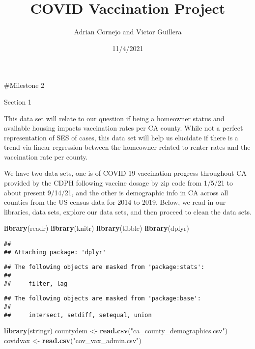 \documentclass[
]{article}
\title{COVID Vaccination Project}
\author{Adrian Cornejo and Victor Guillera}
\date{11/4/2021}
\newenvironment{Shaded}{\begin{snugshade}}{\end{snugshade}}
\newcommand{\KeywordTok}[1]{\textcolor[rgb]{0.13,0.29,0.53}{\textbf{#1}}}
\newcommand{\NormalTok}[1]{#1}
\newcommand{\StringTok}[1]{\textcolor[rgb]{0.31,0.60,0.02}{#1}}
\begin{document}
\maketitle

\#Milestone 2

Section 1

This data set will relate to our question if being a homeowner status
and available housing impacts vaccination rates per CA county. While not
a perfect representation of SES of cases, this data set will help us
elucidate if there is a trend via linear regression between the
homeowner-related to renter rates and the vaccination rate per county.

We have two data sets, one is of COVID-19 vaccination progress
throughout CA provided by the CDPH following vaccine dosage by zip code
from 1/5/21 to about present 9/14/21, and the other is demographic info
in CA across all counties from the US census data for 2014 to 2019.
Below, we read in our libraries, data sets, explore our data sets, and
then proceed to clean the data sets.

\begin{Shaded}
\begin{Highlighting}[]
\KeywordTok{library}\NormalTok{(readr)}
\KeywordTok{library}\NormalTok{(knitr)}
\KeywordTok{library}\NormalTok{(tibble)}
\KeywordTok{library}\NormalTok{(dplyr)}
\end{Highlighting}
\end{Shaded}

\begin{verbatim}
## 
## Attaching package: 'dplyr'
\end{verbatim}

\begin{verbatim}
## The following objects are masked from 'package:stats':
## 
##     filter, lag
\end{verbatim}

\begin{verbatim}
## The following objects are masked from 'package:base':
## 
##     intersect, setdiff, setequal, union
\end{verbatim}

\begin{Shaded}
\begin{Highlighting}[]
\KeywordTok{library}\NormalTok{(stringr)}
\NormalTok{countydem <-}\StringTok{ }\KeywordTok{read.csv}\NormalTok{(}\StringTok{"ca_county_demographics.csv"}\NormalTok{)}
\NormalTok{covidvax <-}\StringTok{ }\KeywordTok{read.csv}\NormalTok{(}\StringTok{"cov_vax_admin.csv"}\NormalTok{)}
\end{Highlighting}
\end{Shaded}
\end{document}
